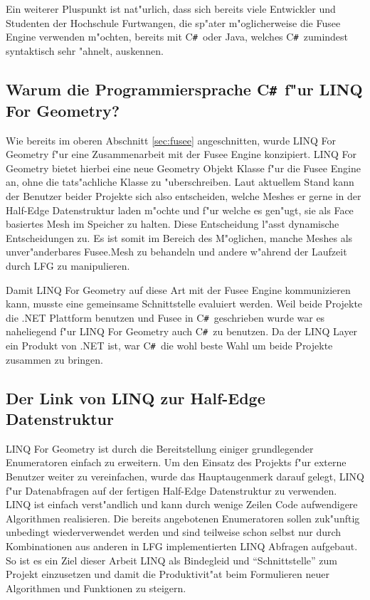 \documentclass[pagesize, paper=a4, fontsize=12pt,titlepage=true, headings=small, headnosepline, abstractoff, liststotoc, nochapterprefix, plainheadsepline]{scrreprt}
\newcommand{\CSS}{C\texttt{\# }}
\newcommand{\LFG}{LINQ For Geometry}
\newcommand{\LFGS}{LINQ For Geometry }
\newcommand{\HES}{Half-Edge Datenstruktur }
\begin{document}
Ein weiterer Pluspunkt ist nat"urlich, dass sich bereits viele Entwickler und Studenten der Hochschule Furtwangen, die sp"ater m"oglicherweise die Fusee Engine verwenden m"ochten, bereits mit \CSS oder Java, welches \CSS zumindest syntaktisch sehr "ahnelt, auskennen.
		\subsection {Warum die Programmiersprache \CSS f"ur \LFG?}
			Wie bereits im oberen Abschnitt \ref{sec:fusee} angeschnitten, wurde \LFGS f"ur eine Zusammenarbeit mit der Fusee Engine konzipiert. \LFGS bietet hierbei eine neue Geometry Objekt Klasse f"ur die Fusee Engine an, ohne die tats"achliche Klasse zu "uberschreiben. Laut aktuellem Stand kann der Benutzer beider Projekte sich also entscheiden, welche Meshes er gerne in der \HES laden m"ochte und f"ur welche es gen"ugt, sie als Face basiertes Mesh im Speicher zu halten. Diese Entscheidung l"asst dynamische Entscheidungen zu. Es ist somit im Bereich des M"oglichen, manche Meshes als unver"anderbares Fusee.Mesh zu behandeln und andere w"ahrend der Laufzeit durch LFG zu manipulieren.
\newline

Damit \LFGS auf diese Art mit der Fusee Engine kommunizieren kann, musste eine gemeinsame Schnittstelle evaluiert werden. Weil beide Projekte die .NET Plattform benutzen und Fusee in \CSS geschrieben wurde war es naheliegend f"ur \LFGS auch \CSS zu benutzen. Da der LINQ Layer ein Produkt von .NET ist, war \CSS die wohl beste Wahl um beide Projekte zusammen zu bringen.
\subsection {Der Link von LINQ zur \HES}
				\LFGS ist durch die Bereitstellung einiger grundlegender Enumeratoren einfach zu erweitern. Um den Einsatz des Projekts f"ur externe Benutzer weiter zu vereinfachen, wurde das Hauptaugenmerk darauf gelegt, LINQ f"ur Datenabfragen auf der fertigen \HES zu verwenden. LINQ ist einfach verst"andlich und kann durch wenige Zeilen Code aufwendigere Algorithmen realisieren. Die bereits angebotenen Enumeratoren sollen zuk"unftig unbedingt wiederverwendet werden und sind teilweise schon selbst nur durch Kombinationen aus anderen in LFG implementierten LINQ Abfragen aufgebaut. So ist es ein Ziel dieser Arbeit LINQ als Bindegleid und "`Schnittstelle"' zum Projekt einzusetzen und damit die Produktivit"at beim Formulieren neuer Algorithmen und Funktionen zu steigern.
\end{document}
